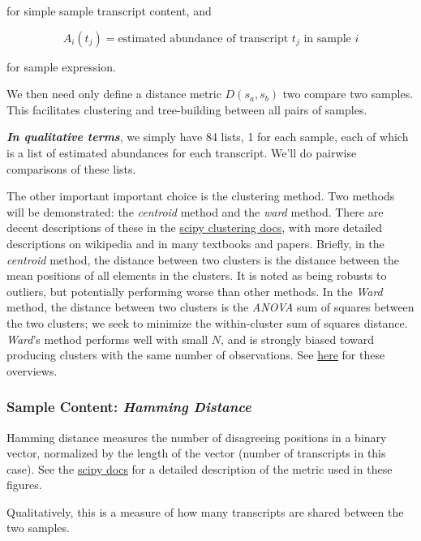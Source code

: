 \documentclass{article}
\begin{document}
for simple sample transcript content, and

\[A_i(t_j) = \text{estimated abundance of transcript } t_j \text{ in sample } i\]

for sample expression.

We then need only define a distance metric $D(s_a,s_b)$ two compare two
samples. This facilitates clustering and tree-building between all pairs
of samples.

\emph{\textbf{In qualitative terms}}, we simply have 84 lists, 1 for
each sample, each of which is a list of estimated abundances for each
transcript. We'll do pairwise comparisons of these lists.

The other important important choice is the clustering method. Two
methods will be demonstrated: the \emph{centroid} method and the
\emph{ward} method. There are decent descriptions of these in the
\href{http://docs.scipy.org/doc/scipy-0.13.0/reference/generated/scipy.cluster.hierarchy.linkage.html}{scipy
clustering docs}, with more detailed descriptions on wikipedia and in
many textbooks and papers. Briefly, in the \emph{centroid} method, the
distance between two clusters is the distance between the mean positions
of all elements in the clusters. It is noted as being robusts to
outliers, but potentially performing worse than other methods. In the
\emph{Ward} method, the distance between two clusters is the
\emph{ANOVA} sum of squares between the two clusters; we seek to
minimize the within-cluster sum of squares distance. \emph{Ward}'s
method performs well with small $N$, and is strongly biased toward
producing clusters with the same number of observations. See
\href{http://v8doc.sas.com/sashtml/stat/chap23/sect12.htm}{here} for
these overviews.


    \subsubsection{Sample Content: \emph{Hamming Distance}}


    Hamming distance measures the number of disagreeing positions in a
binary vector, normalized by the length of the vector (number of
transcripts in this case). See the
\href{http://docs.scipy.org/doc/scipy-0.13.0/reference/generated/scipy.spatial.distance.hamming.html\#scipy.spatial.distance.hamming}{scipy
docs} for a detailed description of the metric used in these figures.

Qualitatively, this is a measure of how many transcripts are shared
between the two samples.
\end{document}
